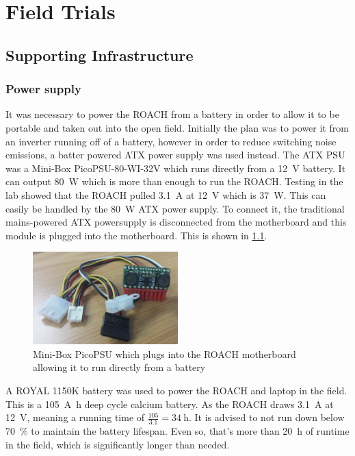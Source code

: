 \chapter{Field Trials}
\label{ch:field-trials}
\graphicspath{{./img/field-trials/}}

\section{Supporting Infrastructure}

\subsection{Power supply}
It was necessary to power the ROACH from a battery in order to allow it to be portable and taken out into the open field.
Initially the plan was to power it from an inverter running off of a battery, however in order to reduce switching noise emissions, a batter powered ATX power supply was used instead. The ATX PSU was a Mini-Box PicoPSU-80-WI-32V which runs directly from a \SI{12}{\volt} battery. 
It can output \SI{80}{\watt} which is more than enough to run the ROACH. 
Testing in the lab showed that the ROACH pulled \SI{3.1}{\ampere} at \SI{12}{\volt} which is \SI{37}{\watt}. This can easily be handled by the \SI{80}{\watt} ATX power supply.
To connect it, the traditional mains-powered ATX powersupply is disconnected from the motherboard and this module is plugged into the motherboard. 
This is shown in \cref{fig:field-trials:atx-psu}.

\begin{figure}
  \centering
  \includegraphics[width=0.5\textwidth]{atx-psu}
  \caption{Mini-Box PicoPSU which plugs into the ROACH motherboard allowing it to run directly from a battery}
  \label{fig:field-trials:atx-psu}
\end{figure}

A ROYAL 1150K battery was used to power the ROACH and laptop in the field. 
This is a \SI{105}{\ampere\hour} deep cycle calcium battery.
As the ROACH draws \SI{3.1}{\ampere} at \SI{12}{\volt}, meaning a running time of \(\frac{105}{3.1} = \SI{34}{\hour}\).
It is advised to not run down below \SI{70}{\percent} to maintain the battery lifespan. Even so, that's more than \SI{20}{\hour} of runtime in the field, which is significantly longer than needed.



